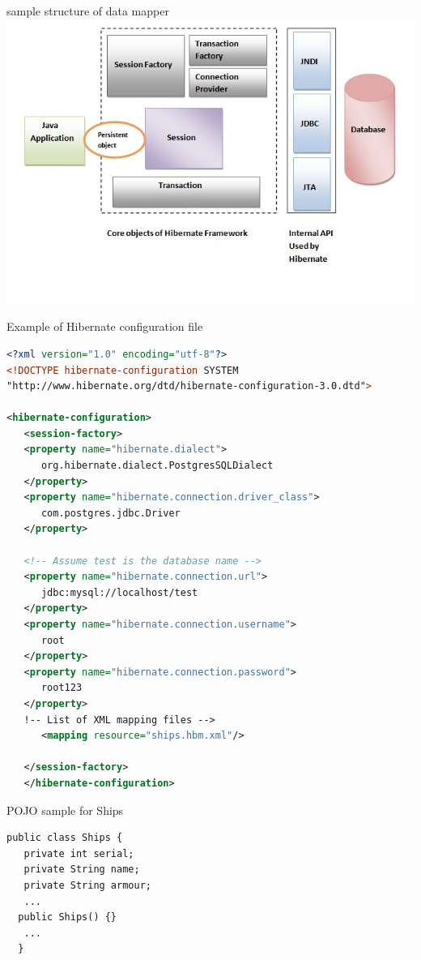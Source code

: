 \documentclass{beamer}
\begin{document}
\begin{slide}{
\item sample structure of data mapper 
\\
\includegraphics[scale=0.5]{img/Hibernate.jpg}
}\end{slide}

\begin{frame}[fragile]
Example of Hibernate configuration file 
\begin{lstlisting}[language=XML]
<?xml version="1.0" encoding="utf-8"?>
<!DOCTYPE hibernate-configuration SYSTEM 
"http://www.hibernate.org/dtd/hibernate-configuration-3.0.dtd">

<hibernate-configuration>
   <session-factory>
   <property name="hibernate.dialect">
      org.hibernate.dialect.PostgresSQLDialect
   </property>
   <property name="hibernate.connection.driver_class">
      com.postgres.jdbc.Driver
   </property>

   <!-- Assume test is the database name -->
   <property name="hibernate.connection.url">
      jdbc:mysql://localhost/test
   </property>
   <property name="hibernate.connection.username">
      root
   </property>
   <property name="hibernate.connection.password">
      root123
   </property>
   !-- List of XML mapping files -->
      <mapping resource="ships.hbm.xml"/>

   </session-factory>
   </hibernate-configuration>
\end{lstlisting}
\end{frame}

\begin{frame}[fragile]
POJO sample for Ships 
\begin{lstlisting}
public class Ships {
   private int serial;
   private String name; 
   private String armour;   
   ...
  public Ships() {}
   ...  
  }
 \end{lstlisting} 
\end{frame}
\end{document}
